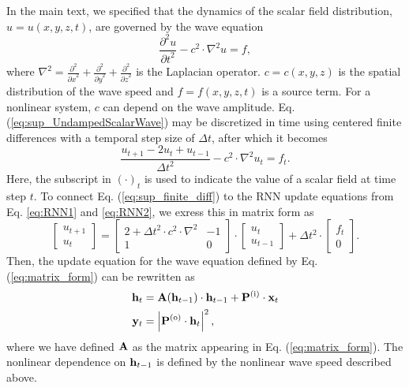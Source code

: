 In the main text, we specified that the dynamics of the scalar field distribution, $u = u{\left(x,y,z,t\right)}$, are governed by the wave equation
\begin{equation}
    \frac{\partial^2{u}}{{\partial{t}}^2} - c^2 \cdot \nabla^2 u = f,
    \label{eq:sup_UndampedScalarWave}
\end{equation}
where $\nabla^2 = \frac{\partial^2}{{\partial{x}}^2} + \frac{\partial^2}{{\partial{y}}^2} + \frac{\partial^2}{{\partial{z}}^2}$ is the Laplacian operator.
$c = c{\left(x,y,z\right)}$ is the spatial distribution of the wave speed and $f = f{\left(x,y,z,t\right)}$ is a source term.  
For a nonlinear system, $c$ can depend on the wave amplitude. 
Eq. (\ref{eq:sup_UndampedScalarWave}) may be discretized in time using centered finite differences with a temporal step size of $\Delta{t}$, after which it becomes
\begin{equation}
        \frac{u_{t+1} - 2 u_t + u_{t-1}}{{\Delta{t}}^2} -  c^2\cdot \nabla^2 u_t = f_t.
        \label{eq:sup_finite_diff}
\end{equation}
Here, the subscript in $(\cdot)_t$ is used to indicate the value of a scalar field at time step $t$. To connect Eq. (\ref{eq:sup_finite_diff}) to the RNN update equations from Eq. \ref{eq:RNN1} and \ref{eq:RNN2}, we exress this in matrix form as
%
\begin{equation}
    \begin{bmatrix}
    u_{t+1} \\ u_t
    \end{bmatrix}
    = 
    \begin{bmatrix}
    2 + \Delta t^2\cdot c^2 \cdot \nabla^2 
    & -1  \\
    1 & 0
    \end{bmatrix}
    \cdot
    \begin{bmatrix}
    u_{t} \\ u_{t-1}
    \end{bmatrix}    
    +
    \Delta{t}^2 \cdot \begin{bmatrix}
     f_{t} \\ 0
    \end{bmatrix}.
    \label{eq:matrix_form}
\end{equation}
%
Then, the update equation for the wave equation defined by Eq. (\ref{eq:matrix_form}) can be rewritten as
%
\begin{align}
\mathbf{h}_t &= \mathbf{A}{\left(\mathbf{h}_{t-1}\right)} \cdot \mathbf{h}_{t-1} + \mathbf{P}^{(\textrm{i})} \cdot \mathbf{x}_t \label{eq:sup_ScalarRNN1}\\
\mathbf{y}_t &= \left\vert \mathbf{P}^{(\textrm{o})} \cdot \mathbf{h}_t \right\vert^2, \label{eq:sup_ScalarRNN2}
\end{align}
where we have defined $\mathbf{A}$ as the matrix appearing in Eq. (\ref{eq:matrix_form}).
The nonlinear dependence on $\mathbf{h}_{t-1}$ is defined by the nonlinear wave speed described above.

